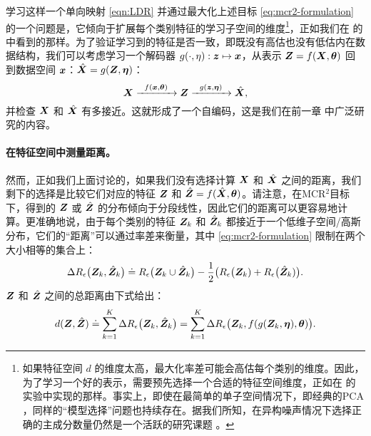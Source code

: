 \documentclass[../../book-main_zh.tex]{subfiles}
\begin{document}
{学习这样一个单向映射 \eqref{eqn:LDR} 并通过最大化上述目标 \eqref{eq:mcr2-formulation} 的一个问题是，它倾向于扩展每个类别特征的学习子空间的维度\footnote{如果特征空间 $d$ 的维度太高，最大化率差可能会高估每个类别的维度。因此，为了学习一个好的表示，需要预先选择一个合适的特征空间维度，正如在 \cite{yu2020learning} 的实验中实现的那样。事实上，即使在最简单的单子空间情况下，即经典的PCA \cite{Jolliffe1986}，同样的“模型选择”问题也持续存在。据我们所知，在异构噪声情况下选择正确的主成分数量仍然是一个活跃的研究课题 \cite{hong2020selecting}。}，正如我们在  的  中看到的那样。为了验证学习到的特征是否一致，即既没有高估也没有低估内在数据结构，我们可以考虑学习一个解码器 $g(\cdot,\eta): \bm{z} \mapsto  \bm{x}$，从表示 $\bm{Z} = f(\bm{X},\bm\theta)$ 回到数据空间 $\bm{x}$：$\hat {\bm{X}} = g(\bm{Z}, \bm\eta)$：
\begin{equation}
    \bm{X} \xrightarrow{\hspace{2mm} f(\bm{x}, \bm\theta)\hspace{2mm}} \bm{Z} \xrightarrow{\hspace{2mm} g(\bm{z}, \bm \eta) \hspace{2mm}} \hat {\bm{X}}, 
    \label{eqn:autoencoding-ch6}
\end{equation}
并检查 $\bm{X}$ 和 $\hat {\bm{X}}$ 有多接近。这就形成了一个自编码，这是我们在前一章  中广泛研究的内容。

\paragraph{在特征空间中测量距离。}
然而，正如我们上面讨论的，如果我们没有选择计算 $\bm{X}$ 和 $\hat {\bm{X}}$ 之间的距离，我们剩下的选择是比较它们对应的特征 $\bm{Z}$ 和 $\hat {\bm{Z}} = f(\hat {\bm{X}}, \bm \theta)$。请注意，在MCR$^2$目标下，得到的 $\bm{Z}$ 或 $\hat {\bm{Z}}$ 的分布倾向于分段线性，因此它们的距离可以更容易地计算。更准确地说，由于每个类别的特征 $\bm{Z}_k$ 和 $\hat{\bm{Z}}_k$ 都接近于一个低维子空间/高斯分布，它们的“距离”可以通过率差来衡量，{其中 \eqref{eq:mcr2-formulation} 限制在两个大小相等的集合上}：
\begin{equation}
\Delta R_\epsilon\big(\bm{Z}_k, \hat{\bm{Z}}_k\big) \doteq R_\epsilon\big(\bm{Z}_k \cup \hat{\bm{Z}}_k\big) - \frac{1}{2} \big( R_\epsilon\big(\bm{Z}_k) + R_\epsilon\big(\hat {\bm{Z}}_k)\big).
\end{equation}
$\bm{Z}$ 和 $\hat {\bm{Z}}$ 之间的总距离由下式给出：
\begin{equation}
d(\bm{Z}, \hat {\bm{Z}}) \doteq   \sum_{k=1}^K \Delta R_\epsilon\big(\bm{Z}_k, \hat{\bm{Z}}_k\big) =  \sum_{k=1}^K \Delta R_\epsilon\big(\bm{Z}_k, f(g(\bm{Z}_k, \bm\eta),\bm \theta)\big).
\label{eqn:Z-distance}
\end{equation}


}
\end{document}
